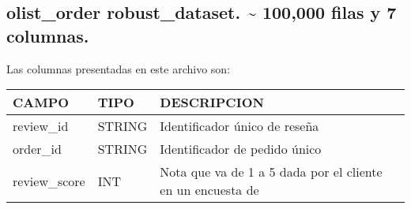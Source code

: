 \documentclass[11pt]{article}
\begin{document}
    \hypertarget{olist_order-robust_dataset.-100000-filas-y-7-columnas.}{%
\subsection{olist\_order robust\_dataset. \textasciitilde{} 100,000
filas y 7
columnas.}\label{olist_order-robust_dataset.-100000-filas-y-7-columnas.}}

Las columnas presentadas en este archivo son:

\begin{longtable}[]{@{}lll@{}}
\toprule
\begin{minipage}[b]{0.30\columnwidth}\raggedright
CAMPO\strut
\end{minipage} & \begin{minipage}[b]{0.30\columnwidth}\raggedright
TIPO\strut
\end{minipage} & \begin{minipage}[b]{0.30\columnwidth}\raggedright
DESCRIPCION\strut
\end{minipage}\tabularnewline
\midrule
\endhead
\begin{minipage}[t]{0.30\columnwidth}\raggedright
review\_id\strut
\end{minipage} & \begin{minipage}[t]{0.30\columnwidth}\raggedright
STRING\strut
\end{minipage} & \begin{minipage}[t]{0.30\columnwidth}\raggedright
Identificador único de reseña\strut
\end{minipage}\tabularnewline
\begin{minipage}[t]{0.30\columnwidth}\raggedright
order\_id\strut
\end{minipage} & \begin{minipage}[t]{0.30\columnwidth}\raggedright
STRING\strut
\end{minipage} & \begin{minipage}[t]{0.30\columnwidth}\raggedright
Identificador de pedido único\strut
\end{minipage}\tabularnewline
\begin{minipage}[t]{0.30\columnwidth}\raggedright
review\_score\strut
\end{minipage} & \begin{minipage}[t]{0.30\columnwidth}\raggedright
INT\strut
\end{minipage} & \begin{minipage}[t]{0.30\columnwidth}\raggedright
Nota que va de 1 a 5 dada por el cliente en un encuesta de

\end{minipage}
\end{longtable}
\end{document}
